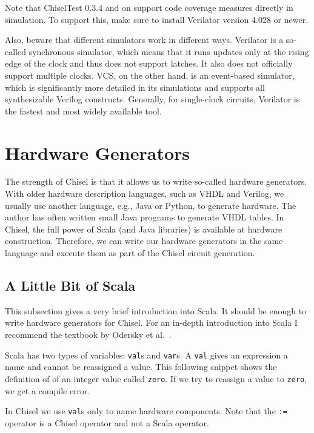 \documentclass[%
    10pt,
    headinclude, footexclude,
    openright, %
    notitlepage,
    cleardoubleempty,
    headsepline,
    pointlessnumbers,
    bibtotoc, idxtotoc,
    ]{scrbook}
\newcommand{\code}[1]{{\small{\texttt{#1}}}}
\begin{document}
Note that ChiselTest 0.3.4 and on support code coverage measures directly in simulation. 
To support this, make sure to install Verilator version 4.028 or newer.

Also, beware that different simulators work in different ways. Verilator is a so-called 
synchronous simulator, which means that it runs updates only at the rising edge of the 
clock and thus does not support latches. It also does not officially support multiple 
clocks. VCS, on the other hand, is an event-based simulator, which is significantly more 
detailed in its simulations and supports all synthesizable Verilog constructs. 
Generally, for single-clock circuits, Verilator is the fastest and 
most widely available tool.





\chapter{Hardware Generators}

The strength of Chisel is that it allows us to write so-called hardware generators.
With older hardware description languages, such as VHDL and Verilog,
we usually use another language, e.g., Java or Python, to generate hardware.
The author has often written small Java programs to generate VHDL tables.
In Chisel, the full power of Scala (and Java libraries) is available at hardware
construction. Therefore, we can write our hardware generators in the same
language and execute them as part of the Chisel circuit generation.

\section{A Little Bit of Scala}

This subsection gives a very brief introduction into Scala. It should be enough
to write hardware generators for Chisel.
For an in-depth introduction into Scala I recommend the textbook by Odersky et al.~\cite{Scala}.

Scala has two types of variables: \code{val}s and \code{var}s. A \code{val} gives an expression
a name and cannot be reassigned a value. This following snippet shows the definition of
of an integer value called \code{zero}. If we try to reassign a value to \code{zero}, we get
a compile error.


\noindent In Chisel we use \code{val}s only to name hardware components. Note that the \code{:=}
operator is a Chisel operator and not a Scala operator.
\end{document}
